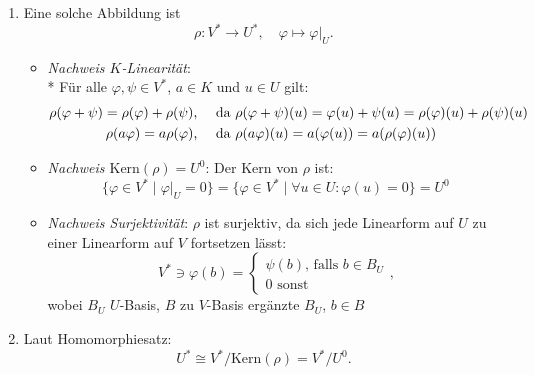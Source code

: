 \begin{enumerate}
	 \item Eine solche Abbildung ist
	 \begin{equation*}
	 	\rho: V^\ast \to U^\ast, \quad \varphi \mapsto \varphi |_U\text{.}
	 \end{equation*}
	 \begin{itemize}
	 	\item \emph{Nachweis \( K \)-Linearität}: \\*
	 		Für alle \( \varphi, \psi \in V^\ast \), \( a \in K \) und \( u \in U \) gilt:
	 		\begin{align*}
	 			\rho(\varphi + \psi) = \rho(\varphi) + \rho(\psi) &\text{, \quad da } \rho(\varphi + \psi)(u) = \varphi(u) + \psi(u) = \rho(\varphi)(u) + \rho(\psi)(u) \\
	 			\rho(a\varphi) = a\rho(\varphi) &\text{, \quad da } \rho(a\varphi)(u) = a(\varphi(u)) = a(\rho(\varphi)(u))
	 		\end{align*}
	 	\item \emph{Nachweis \( \text{Kern}(\rho) = U^0 \)}: Der Kern von \( \rho \) ist:
	 	\begin{equation*}
	 		\{ \varphi \in V^\ast \mid \varphi |_U = 0 \} = \{ \varphi \in V^\ast \mid \forall u \in U: \varphi(u) = 0 \} = U^0
	 	\end{equation*}
	 	\item \emph{Nachweis Surjektivität}: \( \rho \) ist surjektiv, da sich jede Linearform auf \( U \) zu einer Linearform auf \( V \) fortsetzen lässt:
	 	\begin{equation*}
	 		V^\ast \ni \varphi(b) = \begin{cases}
	 			\psi(b)\text{, falls } b \in B_U \\
	 			0 \text{ sonst}
	 		\end{cases}\text{,}
	 	\end{equation*}
	 	wobei \( B_U \) \( U \)-Basis, \( B \) zu \( V \)-Basis ergänzte \( B_U \), \( b \in B \)
	 \end{itemize}

	 \item Laut Homomorphiesatz:
	 \begin{equation*}
	 	U^\ast \cong V^\ast/\text{Kern}(\rho) = V^\ast/U^0\text{.}
	 \end{equation*}
\end{enumerate}

\newpage


